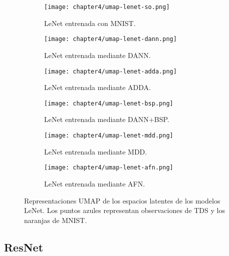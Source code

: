 \begin{figure}[H]
    \centering
    \begin{subfigure}[h]{0.40\textwidth}
        \texttt{[image: chapter4/umap-lenet-so.png]}
        \caption{LeNet entrenada con MNIST.}
        \label{fig:umap-lenet-so}
    \end{subfigure}
    \hfill
    \begin{subfigure}[h]{0.40\textwidth}
        \texttt{[image: chapter4/umap-lenet-dann.png]}
        \caption{LeNet entrenada mediante DANN.}
        \label{fig:umap-lenet-dann}
    \end{subfigure}
    \hfill
    \begin{subfigure}[h]{0.40\textwidth}
        \texttt{[image: chapter4/umap-lenet-adda.png]}
        \caption{LeNet entrenada mediante ADDA.}
        \label{fig:umap-lenet-adda}
    \end{subfigure}
    \hfill
    \begin{subfigure}[h]{0.40\textwidth}
        \texttt{[image: chapter4/umap-lenet-bsp.png]}
        \caption{LeNet entrenada mediante DANN+BSP.}
        \label{fig:umap-lenet-bsp}
    \end{subfigure}
    \hfill
    \begin{subfigure}[h]{0.40\textwidth}
        \texttt{[image: chapter4/umap-lenet-mdd.png]}
        \caption{LeNet entrenada mediante MDD.}
        \label{fig:umap-lenet-mdd}
    \end{subfigure}
    \hfill
    \begin{subfigure}[h]{0.40\textwidth}
        \texttt{[image: chapter4/umap-lenet-afn.png]}
        \caption{LeNet entrenada mediante AFN.}
        \label{fig:umap-lenet-afn}
    \end{subfigure}

    \caption{Representaciones UMAP de los espacios latentes de los modelos LeNet. Los puntos azules representan observaciones de TDS y los naranjas de MNIST.}
    \label{fig:umaps-lenet}
\end{figure}

\subsection{ResNet}

